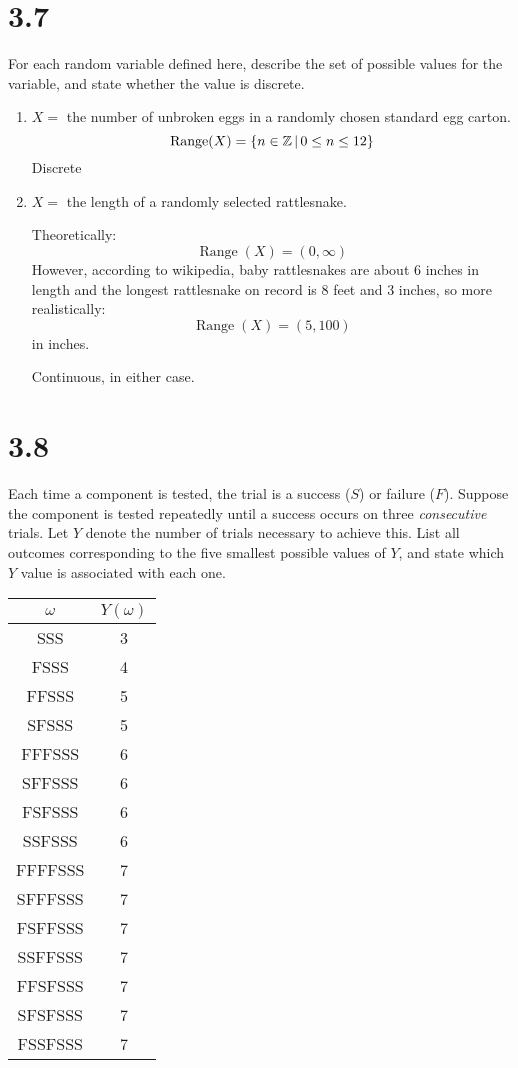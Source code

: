 \documentclass[letterpaper,12pt,fleqn]{article}
\DeclareMathOperator{\range}{Range}
\begin{document}
\section*{3.7}

For each random variable defined here, describe the set of possible values for the variable, and state whether the value is
discrete.

\begin{enumerate}[label={\alph*)}]
\item \(X=\) the number of unbroken eggs in a randomly chosen standard egg carton.
  \[\range(X)=\setb{n\in\mathbb{Z}}{0\le n\le12}\]
  Discrete

  \setcounter{enumi}{3}
\item \(X=\) the length of a randomly selected rattlesnake.
  
  Theoretically:
  \[\range(X)=(0,\infty)\]
  However, according to wikipedia, baby rattlesnakes are about 6 inches in length and the longest rattlesnake on record is
  8 feet and 3 inches, so more realistically:
  \[\range(X)=(5,100)\]
  in inches.

  Continuous, in either case.
\end{enumerate}

\section*{3.8}

Each time a component is tested, the trial is a success (\(S\)) or failure (\(F\)).  Suppose the component is tested
repeatedly until a success occurs on three \emph{consecutive} trials.  Let \(Y\) denote the number of trials necessary
to achieve this.  List all outcomes corresponding to the five smallest possible values of \(Y\), and state which \(Y\)
value is associated with each one.

\bigskip

\begin{center}
  \begin{tabular}{|c|c|}
    \hline
    \(\omega\) & \(Y(\omega)\) \\
    \hline
    SSS & 3 \\
    \hline
    FSSS & 4 \\
    \hline
    FFSSS & 5 \\
    \hline
    SFSSS & 5 \\
    \hline
    FFFSSS & 6 \\
    \hline
    SFFSSS & 6 \\
    \hline
    FSFSSS & 6 \\
    \hline
    SSFSSS & 6 \\
    \hline
    FFFFSSS & 7 \\
    \hline
    SFFFSSS & 7 \\
    \hline
    FSFFSSS & 7 \\
    \hline
    SSFFSSS & 7 \\
    \hline
    FFSFSSS & 7 \\
    \hline
    SFSFSSS & 7 \\
    \hline
    FSSFSSS & 7 \\
    \hline
  \end{tabular}
\end{center}
\end{document}
